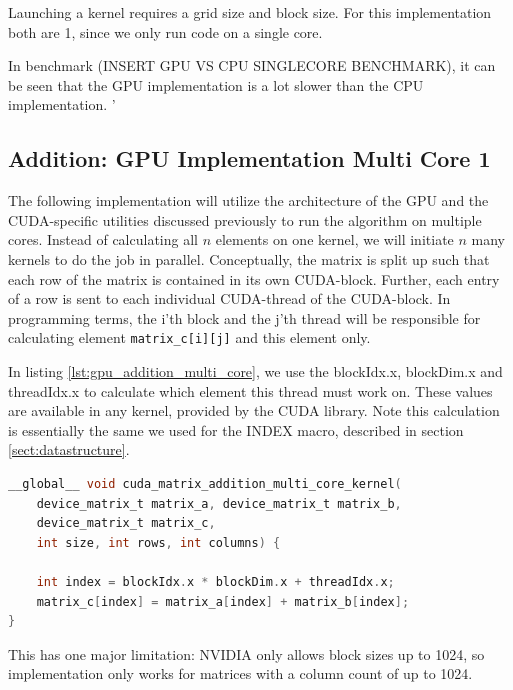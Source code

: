 Launching a kernel requires a grid size and block size. For this implementation both are 1, since we only run code on a single core.

In benchmark (INSERT GPU VS CPU SINGLECORE BENCHMARK), it can be seen that the GPU implementation is a lot slower than the CPU implementation. '


\subsection{Addition: GPU Implementation Multi Core 1}
The following implementation will utilize the architecture of the GPU and the CUDA-specific utilities discussed previously to run the algorithm on multiple cores. Instead of calculating all $n$ elements on one kernel, we will initiate $n$ many kernels to do the job in parallel. Conceptually, the matrix is split up such that each row of the matrix is contained in its own CUDA-block. Further, each entry of a row is sent to each individual CUDA-thread of the CUDA-block. In programming terms, the i'th block and the j'th thread will be responsible for calculating element \texttt{matrix\_c[i][j]} and this element only. 

In listing \ref{lst:gpu_addition_multi_core}, we use the blockIdx.x, blockDim.x and threadIdx.x to calculate which element this thread must work on. These values are available in any kernel, provided by the CUDA library. Note this calculation is essentially the same we used for the INDEX macro, described in section \ref{sect:datastructure}. 

\begin{lstlisting}[language=C, caption={GPU addition multi core}, label={lst:gpu_addition_multi_core}]
__global__ void cuda_matrix_addition_multi_core_kernel(
    device_matrix_t matrix_a, device_matrix_t matrix_b, 
    device_matrix_t matrix_c, 
    int size, int rows, int columns) {
    
    int index = blockIdx.x * blockDim.x + threadIdx.x;
    matrix_c[index] = matrix_a[index] + matrix_b[index];
}
\end{lstlisting}

This has one major limitation: NVIDIA only allows block sizes up to 1024, so implementation only works for matrices with a column count of up to 1024.

